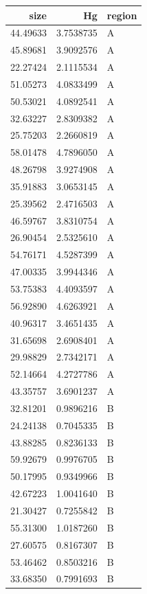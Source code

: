 \documentclass[
  letterpaper,
  DIV=11,
  numbers=noendperiod]{scrartcl}
\begin{document}
\begin{table}
\centering
\begin{tabular}[t]{r|r|l}
\hline
size & Hg & region\\
\hline
44.49633 & 3.7538735 & A\\
\hline
45.89681 & 3.9092576 & A\\
\hline
22.27424 & 2.1115534 & A\\
\hline
51.05273 & 4.0833499 & A\\
\hline
50.53021 & 4.0892541 & A\\
\hline
32.63227 & 2.8309382 & A\\
\hline
25.75203 & 2.2660819 & A\\
\hline
58.01478 & 4.7896050 & A\\
\hline
48.26798 & 3.9274908 & A\\
\hline
35.91883 & 3.0653145 & A\\
\hline
25.39562 & 2.4716503 & A\\
\hline
46.59767 & 3.8310754 & A\\
\hline
26.90454 & 2.5325610 & A\\
\hline
54.76171 & 4.5287399 & A\\
\hline
47.00335 & 3.9944346 & A\\
\hline
53.75383 & 4.4093597 & A\\
\hline
56.92890 & 4.6263921 & A\\
\hline
40.96317 & 3.4651435 & A\\
\hline
31.65698 & 2.6908401 & A\\
\hline
29.98829 & 2.7342171 & A\\
\hline
52.14664 & 4.2727786 & A\\
\hline
43.35757 & 3.6901237 & A\\
\hline
32.81201 & 0.9896216 & B\\
\hline
24.24138 & 0.7045335 & B\\
\hline
43.88285 & 0.8236133 & B\\
\hline
59.92679 & 0.9976705 & B\\
\hline
50.17995 & 0.9349966 & B\\
\hline
42.67223 & 1.0041640 & B\\
\hline
21.30427 & 0.7255842 & B\\
\hline
55.31300 & 1.0187260 & B\\
\hline
27.60575 & 0.8167307 & B\\
\hline
53.46462 & 0.8503216 & B\\
\hline
33.68350 & 0.7991693 & B\\

\end{tabular}
\end{table}
\end{document}
